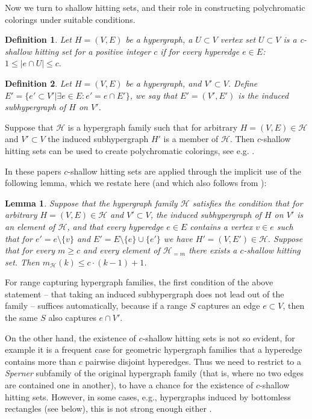 \documentclass[11pt,oneside]{amsart}
\newcommand{\HH}{\mathcal{H}}
\newtheorem{lemma}{Lemma}
\newtheorem{definition}{Definition}
\begin{document}
Now we turn to shallow hitting sets, and their role in constructing polychromatic colorings under suitable conditions.


\begin{definition}
 Let $H=(V,E)$ be a hypergraph, a $U\subset V$ vertex set $U\subset V$ is a {\it c-shallow hitting set} for a positive integer $c$ if for every hyperedge $e\in E$: $1\le|e\cap U|\le c.$
\end{definition} 

\begin{definition}
 Let $H=(V,E)$ be a hypergraph, and $V'\subset V$. Define $E'=\{e'\subset V'| \exists e\in E: e'=e\cap E'\}$, we say that $E'=(V',E')$ is the induced subhypergraph of $H$ on $V'$.
\end{definition}


Suppose that $\HH$ is a hypergraph family such that for arbitrary $H=(V,E)\in\HH$ and $V'\subset V$ the induced subhypergraph $H'$ is a member of $\HH$. Then $c$-shallow hitting sets can be used to create polychromatic colorings, see e.g. \cite{felsik, pshalfplane}.

In these papers $c$-shallow hitting sets are applied through the implicit use of the following lemma, which we restate here (and which also follows from \cite[Theorem 2.11.]{pshalfplane}):

\begin{lemma}\label{prop1}
Suppose that the hypergraph family $\mathcal{H}$ satisfies the condition that for arbitrary $H=(V,E)\in\HH$ and $V'\subset V$, the induced subhypergraph of $H$ on $V'$ is an element of $\HH$, and that every hyperedge $e\in E$ contains a vertex $v\in e$ such that for $e'=e\setminus \{v\}$ and $E'=E\setminus \{e\}\cup\{e'\}$ we have $H'=(V,E')\in\HH.$
Suppose that for every $m\ge c$ and every element of $\mathcal{H}_{=m}$ there exists a $c$-shallow hitting set. Then $m_\mathcal{H}(k) \leq c \cdot (k-1) +1$.
\end{lemma}

For range capturing hypergraph families, the first condition of the above statement -- that taking an induced subhypergraph does not lead out of the family -- suffices automatically, because if a range $S$ captures an edge $e\subset V$, then the same $S$ also captures $e\cap V'$.

On the other hand, the existence of $c$-shallow hitting sets is not so evident, for example it is a frequent case for geometric hypergraph families that a hyperedge contains more than $c$ pairwise disjoint hyperedges. 
Thus we need to restrict to a {\it Sperner} subfamily of the original hypergraph family (that is, where no two edges are contained one in another), to have a chance for the existence of $c$-shallow hitting sets. However, in some cases, e.g., hypergraphs induced by bottomless rectangles (see below), this is not strong enough either \cite{pshalfplane}. 
\end{document}
